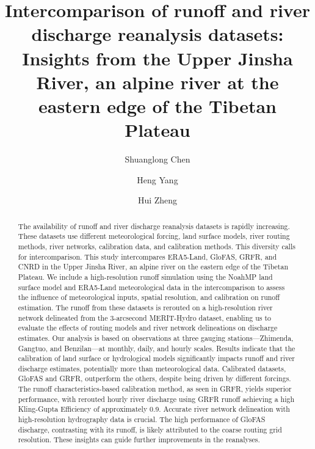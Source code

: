 \documentclass[preprint, review, authoryear, longtitle, 12pt, 3p]{elsarticle}
\begin{document}
\begin{frontmatter}
  \title{Intercomparison of runoff and river discharge reanalysis datasets: Insights from the Upper Jinsha River, an alpine river at the eastern edge of the Tibetan Plateau}

  \author[1]{Shuanglong Chen}

  \author[2]{Heng Yang}

  \author[3]{Hui Zheng}




  \begin{abstract}
    The availability of runoff and river discharge reanalysis datasets is rapidly increasing. These datasets use different meteorological forcing, land surface models, river routing methods, river networks, calibration data, and calibration methods. This diversity calls for intercomparison. This study intercompares ERA5-Land, GloFAS, GRFR, and CNRD in the Upper Jinsha River, an alpine river on the eastern edge of the Tibetan Plateau. We include a high-resolution runoff simulation using the NoahMP land surface model and ERA5-Land meteorological data in the intercomparison to assess the influence of meteorological inputs, spatial resolution, and calibration on runoff estimation. The runoff from these datasets is rerouted on a high-resolution river network delineated from the 3-arcsecond MERIT-Hydro dataset, enabling us to evaluate the effects of routing models and river network delineations on discharge estimates. Our analysis is based on observations at three gauging stations—Zhimenda, Gangtuo, and Benzilan—at monthly, daily, and hourly scales. Results indicate that the calibration of land surface or hydrological models significantly impacts runoff and river discharge estimates, potentially more than meteorological data. Calibrated datasets, GloFAS and GRFR, outperform the others, despite being driven by different forcings. The runoff characteristics-based calibration method, as seen in GRFR, yields superior performance, with rerouted hourly river discharge using GRFR runoff achieving a high Kling-Gupta Efficiency of approximately 0.9. Accurate river network delineation with high-resolution hydrography data is crucial. The high performance of GloFAS discharge, contrasting with its runoff, is likely attributed to the coarse routing grid resolution. These insights can guide further improvements in the reanalyses.
  \end{abstract}


\end{frontmatter}
\end{document}
